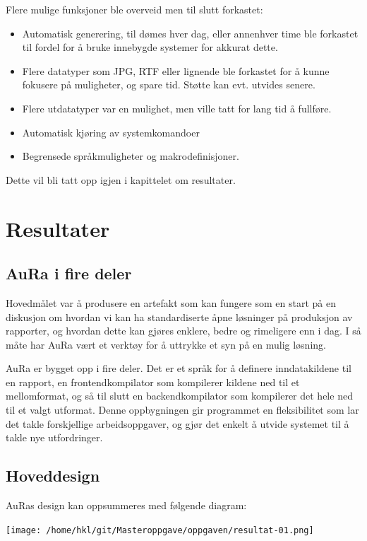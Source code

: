 \documentclass[norsk, 11pt, a4paper]{article}
\begin{document}
Flere mulige funksjoner ble overveid men til slutt forkastet:

\begin{itemize}
\item Automatisk generering, til dømes hver dag, eller annenhver time ble forkastet til fordel for å bruke innebygde systemer for akkurat dette.
\item Flere datatyper som JPG, RTF eller lignende ble forkastet for å kunne fokusere på muligheter, og spare tid. Støtte kan evt. utvides senere.
\item Flere utdatatyper var en mulighet, men ville tatt for lang tid å fullføre.
\item Automatisk kjøring av systemkomandoer
\item Begrensede språkmuligheter og makrodefinisjoner.
\end{itemize}
Dette vil bli tatt opp igjen i kapittelet om resultater.

\newpage \section{Resultater}

\subsection{AuRa i fire deler}

Hovedmålet var å produsere en artefakt som kan fungere som en start på en diskusjon om hvordan vi kan ha standardiserte åpne løsninger på produksjon av rapporter, og hvordan dette kan gjøres enklere, bedre og rimeligere enn i dag. I så måte har AuRa vært et verktøy for å uttrykke et syn på en mulig løsning.

AuRa er bygget opp i fire deler. Det er et språk for å definere inndatakildene til en rapport, en frontendkompilator som kompilerer kildene ned til et mellomformat, og så til slutt en backendkompilator som kompilerer det hele ned til et valgt utformat.
Denne oppbygningen gir programmet en fleksibilitet som lar det takle forskjellige arbeidsoppgaver, og gjør det enkelt å utvide systemet til å takle nye utfordringer.

\subsection{Hoveddesign}

AuRas design kan oppsummeres med følgende diagram:

\texttt{[image: /home/hkl/git/Masteroppgave/oppgaven/resultat-01.png]}
\end{document}
